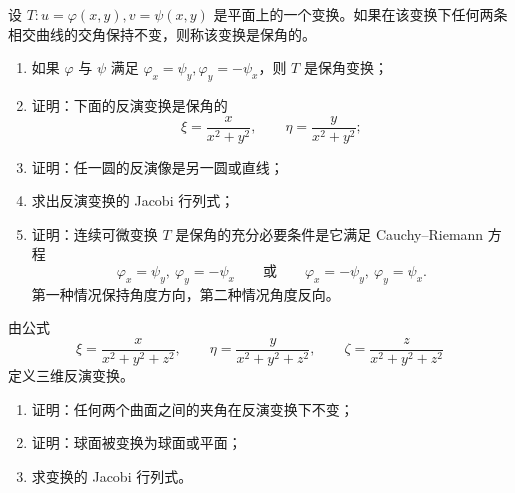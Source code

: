\begin{xreferenceproblem}[7]
设 $T:u=\varphi(x,y),v=\psi(x,y)$ 是平面上的一个变换。如果在该变换下任何两条相交曲线的交角保持不变，则称该变换是保角的。
  \begin{enumerate}[label=(\arabic*)]
    \item 如果 $\varphi$ 与 $\psi$ 满足 $\varphi_x=\psi_y,\varphi_y=-\psi_x$，则 $T$ 是保角变换；
    \item 证明：下面的反演变换是保角的
    \[
      \xi=\frac{x}{x^2+y^2},\qquad
      \eta=\frac{y}{x^2+y^2};
    \]
    \item 证明：任一圆的反演像是另一圆或直线；
    \item 求出反演变换的 Jacobi 行列式；
    \item 证明：连续可微变换 $T$ 是保角的充分必要条件是它满足 Cauchy--Riemann 方程
    \[
      \varphi_x=\psi_y,\ \varphi_y=-\psi_x
      \qquad\text{或}\qquad
      \varphi_x=-\psi_y,\ \varphi_y=\psi_x.
    \]
    第一种情况保持角度方向，第二种情况角度反向。
  \end{enumerate}
\end{xreferenceproblem}

\begin{xreferenceproblem}[8]
由公式
  \[
    \xi=\frac{x}{x^2+y^2+z^2},\qquad
    \eta=\frac{y}{x^2+y^2+z^2},\qquad
    \zeta=\frac{z}{x^2+y^2+z^2}
  \]
  定义三维反演变换。
  \begin{enumerate}[label=(\arabic*)]
    \item 证明：任何两个曲面之间的夹角在反演变换下不变；
    \item 证明：球面被变换为球面或平面；
    \item 求变换的 Jacobi 行列式。
  \end{enumerate}
\end{xreferenceproblem}
